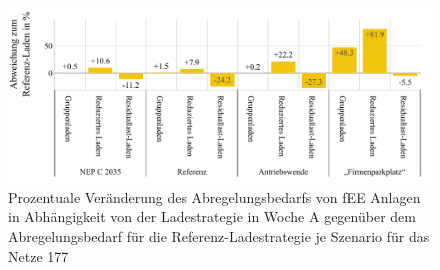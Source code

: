 \begin{figure}[H]
    \centering
    \includegraphics[width=\textwidth]{Bilder/177_cur_fee_grid_week_A}
    \caption{Prozentuale Veränderung des Abregelungsbedarfs von fEE Anlagen in Abhängigkeit von der Ladestrategie in Woche A gegenüber dem Abregelungsbedarf für die Referenz-Ladestrategie je Szenario für das Netze \num{177}}\label{fig:177_cur_fee_grid_week_A}
\end{figure}